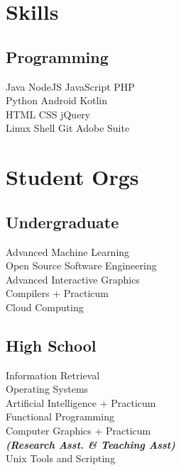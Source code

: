 \documentclass[letterpaper]{deedy-resume} %
\begin{document}
\begin{minipage}[t]{0.33\textwidth}
\sectionspace %


\section{Skills}

\subsection{Programming}
Java \textbullet{} NodeJS \textbullet{} JavaScript \textbullet{} PHP \\
Python \textbullet{} Android \textbullet{} Kotlin \\
HTML \textbullet{} CSS \textbullet{} jQuery \\
Linux \textbullet{} Shell \textbullet{} Git \textbullet{} Adobe Suite \\

\sectionspace %


\section{Student Orgs}

\subsection{Undergraduate}

Advanced Machine Learning \\
Open Source Software Engineering \\
Advanced Interactive Graphics \\
Compilers + Practicum \\
Cloud Computing

\sectionspace %


\subsection{High School}

Information Retrieval \\
Operating Systems \\
Artificial Intelligence + Practicum \\
Functional Programming \\
Computer Graphics + Practicum \\
{\footnotesize \textit{\textbf{(Research Asst. \& Teaching Asst) }}} \\
Unix Tools and Scripting


\end{minipage}
\end{document}
